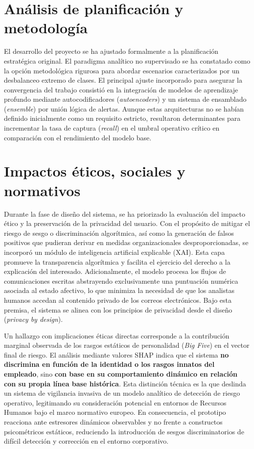 \documentclass[IB]{TFUOC}%
\begin{document}
\section{Análisis de planificación y metodología}
El desarrollo del proyecto se ha ajustado formalmente a la planificación estratégica original. El paradigma analítico no supervisado se ha constatado como la opción metodológica rigurosa para abordar escenarios caracterizados por un desbalanceo extremo de clases. El principal ajuste incorporado para asegurar la convergencia del trabajo consistió en la integración de modelos de aprendizaje profundo mediante autocodificadores (\textit{autoencoders}) y un sistema de ensamblado (\textit{ensemble}) por unión lógica de alertas. Aunque estas arquitecturas no se habían definido inicialmente como un requisito estricto, resultaron determinantes para incrementar la tasa de captura (\textit{recall}) en el umbral operativo crítico en comparación con el rendimiento del modelo base.

\section{Impactos éticos, sociales y normativos}
Durante la fase de diseño del sistema, se ha priorizado la evaluación del impacto ético y la preservación de la privacidad del usuario. Con el propósito de mitigar el riesgo de sesgo o discriminación algorítmica, así como la generación de falsos positivos que pudieran derivar en medidas organizacionales desproporcionadas, se incorporó un módulo de inteligencia artificial explicable (XAI). Esta capa promueve la transparencia algorítmica y facilita el ejercicio del derecho a la explicación del interesado. Adicionalmente, el modelo procesa los flujos de comunicaciones escritas abstrayendo exclusivamente una puntuación numérica asociada al estado afectivo, lo que minimiza la necesidad de que los analistas humanos accedan al contenido privado de los correos electrónicos. Bajo esta premisa, el sistema se alinea con los principios de privacidad desde el diseño (\textit{privacy by design}).

\medskip
\noindent Un hallazgo con implicaciones éticas directas corresponde a la contribución marginal observada de los rasgos estáticos de personalidad (\textit{Big Five}) en el vector final de riesgo. El análisis mediante valores SHAP indica que el sistema \textbf{no discrimina en función de la identidad o los rasgos innatos del empleado}, sino \textbf{con base en su comportamiento dinámico en relación con su propia línea base histórica}. Esta distinción técnica es la que deslinda un sistema de vigilancia invasiva de un modelo analítico de detección de riesgo operativo, legitimando su consideración potencial en entornos de Recursos Humanos bajo el marco normativo europeo. En consecuencia, el prototipo reacciona ante estresores dinámicos observables y no frente a constructos psicométricos estáticos, reduciendo la introducción de sesgos discriminatorios de difícil detección y corrección en el entorno corporativo.
\end{document}
